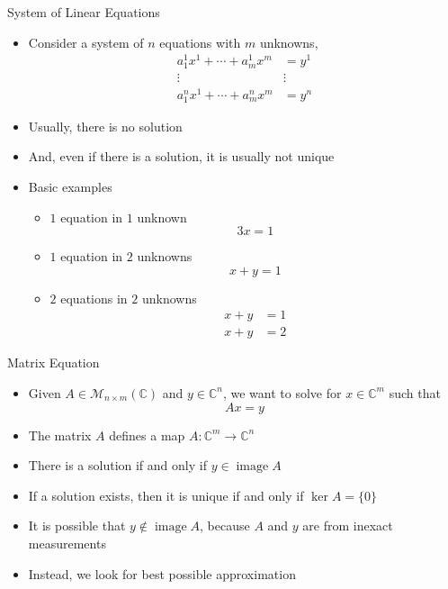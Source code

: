 \documentclass[usenames,dvipsnames,10pt]{beamer}
\newcommand\C{\mathbb{C}}
\newcommand\image{\operatorname{image}}
\begin{document}
\begin{frame}
  {System of Linear Equations}

  \begin{itemize}
  \item Consider a system of $n$ equations with $m$ unknowns,
    \begin{align*}
      a^1_1x^1 + \cdots + a^1_mx^m &= y^1\\
      \vdots & \vdots\\
      a^n_1x^1 + \cdots + a^n_mx^m &= y^n
    \end{align*}
  \item Usually, there is no solution
  \item And, even if there is a solution, it is usually not unique
  \item Basic examples
    \begin{itemize}
    \item $1$ equation in $1$ unknown
      \[
        3x = 1
      \]
    \item $1$ equation in $2$ unknowns
      \[
        x + y = 1
      \]
    \item $2$ equations in $2$ unknowns
      \begin{align*}
        x + y &= 1\\
        x + y &= 2
      \end{align*}
    \end{itemize}
  \end{itemize}
\end{frame}

\begin{frame}
  {Matrix Equation}
  \begin{itemize}
  \item Given $A \in \mathcal{M}_{n\times m}(\C)$ and $y \in \C^n$, we want to solve for $x \in \C^m$ such that
    \[
      Ax = y
    \]
  \item The matrix $A$ defines a map $A: \C^m \rightarrow \C^n$
  \item There is a solution if and only if $y \in \image A$
  \item If a solution exists, then it is unique if and only if $\ker A = \{0\}$
  \item It is possible that $y \notin \image A$, because $A$ and $y$ are from inexact measurements
  \item Instead, we look for best possible approximation
  \end{itemize}
\end{frame}
\end{document}
